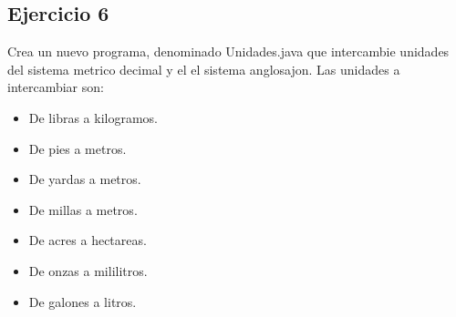 \documentclass[4paper]{article}
\begin{document}
\subsection{Ejercicio 6}
Crea un nuevo programa, denominado Unidades.java que intercambie unidades del sistema metrico decimal y el el sistema anglosajon. Las unidades a intercambiar son:
\begin{itemize}
\item De libras a kilogramos.
\item De pies a metros.
\item De yardas a metros.
\item De millas a metros.
\item De acres a hectareas.
\item De onzas a mililitros.
\item De galones a litros.
\end{itemize}
\end{document}

